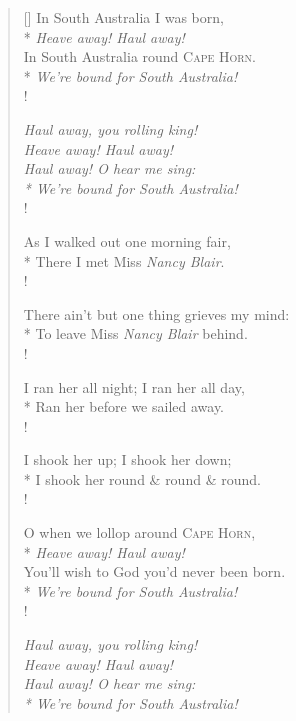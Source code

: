 \settowidth{\versewidth}{You'll wish to God you'd never been born.}
\begin{verse}[\versewidth]
In South Australia I was born,\\*
\vin \textit{Heave away! Haul away!}\\
In South Australia round \textsc{Cape Horn}.\\*
\vin \textit{We're bound for South Australia!}\\!

{\itshape
Haul away, you rolling king!\\
Heave away! Haul away!\\
Haul away! O hear me sing:\\*
We're bound for South Australia!}\\!

As I walked out one morning fair,\\*
There I met Miss \textit{Nancy Blair}.\\!

There ain't but one thing grieves my mind:\\*
To leave Miss \textit{Nancy Blair} behind.\\!

I ran her all night; I ran her all day,\\*
Ran her before we sailed away.\\!

I shook her up; I shook her down;\\*
I shook her round \& round \& round.\\!

O when we lollop around \textsc{Cape Horn},\\*
\vin \textit{Heave away! Haul away!}\\
You'll wish to God you'd never been born.\\*
\vin \textit{We're bound for South Australia!}\\!

{\itshape
Haul away, you rolling king!\\
Heave away! Haul away!\\
Haul away! O hear me sing:\\*
We're bound for South Australia!}
\end{verse}
